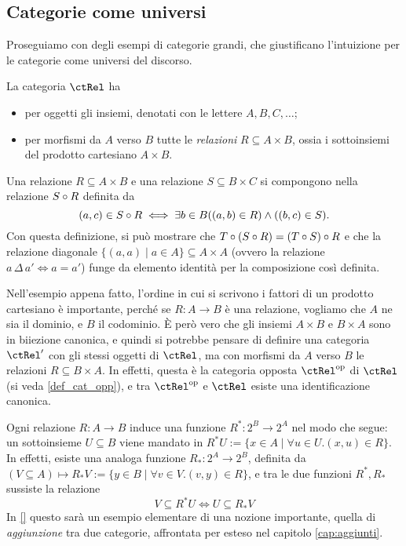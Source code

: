 \subsection{Categorie come universi}\label{ssec:categorie_universi}
Proseguiamo con degli esempi di categorie grandi, che giustificano l'intuizione per le categorie come universi del discorso.
\begin{example}\label{ex_cat_rels}
	La categoria \(\ctRel\) ha
	\begin{itemize}
		\item per oggetti gli insiemi, denotati con le lettere \(A,B,C,\dots\);
		\item per morfismi da \(A\) verso \(B\) tutte le \emph{relazioni} \(R\subseteq A\times B\), ossia i sottoinsiemi del prodotto cartesiano \(A\times B\).
	\end{itemize}
	Una relazione \(R\subseteq A\times B\) e una relazione \(S\subseteq B\times C\) si compongono nella relazione \(S\circ R\) definita da
	\[(a,c)\in S\circ R\iff \exists b\in B ((a,b)\in R)\land ((b,c)\in S).\]
	Con questa definizione, si può mostrare che \(T\circ(S\circ R)=(T\circ S)\circ R\) e che la relazione diagonale \(\{(a,a)\mid a\in A\}\subseteq A\times A\) (ovvero la relazione \(a\,\Delta\,a'\iff a=a'\)) funge da elemento identità per la composizione così definita.
\end{example}
Nell'esempio appena fatto, l'ordine in cui si scrivono i fattori di un prodotto cartesiano è importante, perché se \(R : A\to B\) è una relazione, vogliamo che \(A\) ne sia il dominio, e \(B\) il codominio. \`E però vero che gli insiemi \(A\times B\) e \(B\times A\) sono in biiezione canonica, e quindi si potrebbe pensare di definire una categoria \(\ctRel'\) con gli stessi oggetti di \(\ctRel\), ma con morfismi da \(A\) verso \(B\) le relazioni \(R\subseteq B\times A\). In effetti, questa è la categoria opposta \(\ctRel^\op\) di \(\ctRel\) (si veda \ref{def_cat_opp}), e tra \(\ctRel^\op\) e \(\ctRel\) esiste una identificazione canonica.
\begin{remark}\label{klext_delle_relazioni}
	Ogni relazione \(R : A\to B\) induce una funzione \(R^* : 2^B\to 2^A\) nel modo che segue: un sottoinsieme \(U\subseteq B\) viene mandato in \(R^*U:=\{x\in A\mid \forall u\in U.(x,u)\in R\}\). In effetti, esiste una analoga funzione \(R_* : 2^A\to 2^B\), definita da \((V\subseteq A) \mapsto R_*V:= \{y\in B\mid \forall v\in V.(v,y)\in R\}\), e tra le due funzioni \(R^*, R_*\) sussiste la relazione
	\[V\subseteq R^*U \iff U\subseteq R_*V\label{aggiunti_in_disguise}\]
	In \ref{} questo sarà un esempio elementare di una nozione importante, quella di \emph{aggiunzione} tra due categorie, affrontata per esteso nel capitolo \ref{cap:aggiunti}.
\end{remark}
